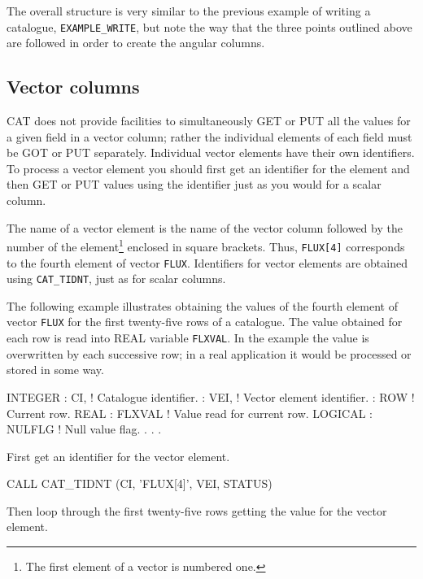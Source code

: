 \documentclass[11pt,twoside]{starlink}
\begin{document}
The overall structure is very similar to the previous example of
writing a catalogue,
\newline \texttt{EXAMPLE\_WRITE}, but note the way that the three points
outlined above are followed in order to create the angular columns.


\subsection{Vector columns}

CAT does not provide facilities to simultaneously GET or PUT all the
values for a given field in a vector column; rather the individual
elements of each field must be GOT or PUT separately. Individual
vector elements have their own identifiers. To process a vector element
you should first get an identifier for the element and then GET or
PUT values using the identifier just as you would for a scalar column.

The name of a vector element is the name of the vector column followed
by the number of the element\footnote{The first element of a vector
is numbered one.} enclosed in square brackets. Thus, \texttt{FLUX[4]}
corresponds to the fourth element of vector \texttt{FLUX}. Identifiers for
vector elements are obtained using \texttt{CAT\_TIDNT}, just as for scalar
columns.

The following example illustrates obtaining the values of the fourth
element of vector \texttt{FLUX} for the first twenty-five rows of a
catalogue. The value obtained for each row is read into REAL variable
\texttt{FLXVAL}. In the example the value is overwritten by each successive
row; in a real application it would be processed or stored in some way.

\begin{terminalv}
      INTEGER
     :  CI,      ! Catalogue identifier.
     :  VEI,     ! Vector element identifier.
     :  ROW      ! Current row.
      REAL
     :  FLXVAL   ! Value read for current row.
      LOGICAL
     :  NULFLG   ! Null value flag.
       .
       .
       .
\end{terminalv}

First get an identifier for the vector element.

\begin{terminalv}
      CALL CAT_TIDNT (CI, 'FLUX[4]', VEI, STATUS)
\end{terminalv}

Then loop through the first twenty-five rows getting the value for the
vector element.
\end{document}

